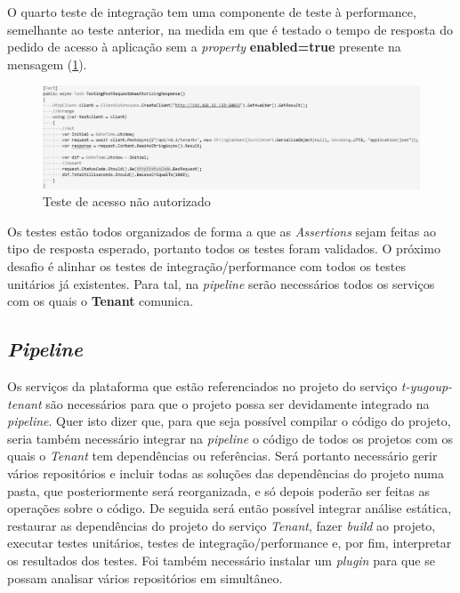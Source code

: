 \hspace{1cm}O quarto teste de integração tem uma componente de teste à performance, semelhante ao teste anterior, na medida em que é testado o tempo de resposta do pedido de acesso à aplicação sem a \textit{property} \textbf{enabled=true} presente na mensagem (\ref{Fig:Fig62}).

\begin{figure}[hbt!]
\centering
\includegraphics[width=0.9\linewidth]{Cap6/TenantUnauthorized.png}
\caption{Teste de acesso não autorizado}
\label{Fig:Fig62}
\end{figure}

\hspace{1cm}Os testes estão todos organizados de forma a que as \textit{Assertions} sejam feitas ao tipo de resposta esperado, portanto todos os testes foram validados. O próximo desafio é alinhar os testes de integração/performance com todos os testes unitários já existentes. Para tal, na \textit{pipeline} serão necessários todos os serviços com os quais o \textbf{Tenant} comunica.

\subsection{\textit{Pipeline}}

\hspace{1cm}Os serviços da plataforma que estão referenciados no projeto do serviço \textit{t-yugoup-tenant} são necessários para que o projeto possa ser devidamente integrado na \textit{pipeline}. Quer isto dizer que, para que seja possível compilar o código do projeto, seria também necessário integrar na \textit{pipeline} o código de todos os projetos com os quais o \textit{Tenant} tem dependências ou referências. Será portanto necessário gerir vários repositórios e incluir todas as soluções das dependências do projeto numa pasta, que posteriormente será reorganizada, e só depois poderão ser feitas as operações sobre o código. De seguida será então possível integrar análise estática, restaurar as dependências do projeto do serviço \textit{Tenant}, fazer \textit{build} ao projeto, executar testes unitários, testes de integração/performance e, por fim, interpretar os resultados dos testes. Foi também necessário instalar um \textit{plugin} para que se possam analisar vários repositórios em simultâneo.

